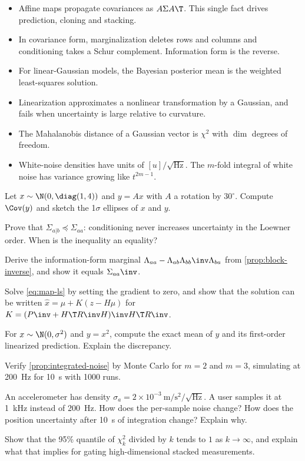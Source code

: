 \begin{takeaways}
\begin{itemize}
  \item Affine maps propagate covariances as $A\Sigma A\T$. This single fact drives prediction,
        cloning and stacking.
  \item In covariance form, marginalization deletes rows and columns and conditioning takes a Schur
        complement. Information form is the reverse.
  \item For linear-Gaussian models, the Bayesian posterior mean is the weighted least-squares
        solution.
  \item Linearization approximates a nonlinear transformation by a Gaussian, and fails when
        uncertainty is large relative to curvature.
  \item The Mahalanobis distance of a Gaussian vector is $\chi^2$ with $\dim$ degrees of freedom.
  \item White-noise densities have units of $[u]/\sqrt{\mathrm{Hz}}$. The $m$-fold integral of white
        noise has variance growing like $t^{2m-1}$.
\end{itemize}
\end{takeaways}

\begin{exercises}
  \item Let $x \sim \N(0, \diag(1, 4))$ and $y = Ax$ with $A$ a rotation by $30^\circ$. Compute
        $\Cov(y)$ and sketch the 1$\sigma$ ellipses of $x$ and $y$.
  \item Prove that $\Sigma_{a|b} \preceq \Sigma_{aa}$: conditioning never increases uncertainty in the
        Loewner order. When is the inequality an equality?
  \item Derive the information-form marginal $\Lambda_{aa} - \Lambda_{ab}\Lambda_{bb}\inv\Lambda_{ba}$
        from \cref{prop:block-inverse}, and show it equals $\Sigma_{aa}\inv$.
  \item Solve \eqref{eq:map-ls} by setting the gradient to zero, and show that the solution can be
        written $\hat x = \mu + K(z - H\mu)$ for $K = (P\inv + H\T R\inv H)\inv H\T R\inv$.
  \item For $x \sim \N(0, \sigma^2)$ and $y = x^2$, compute the exact mean of $y$ and its first-order
        linearized prediction. Explain the discrepancy.
  \item Verify \cref{prop:integrated-noise} by Monte Carlo for $m = 2$ and $m = 3$, simulating at
        200~Hz for 10~s with 1000 runs.
  \item An accelerometer has density $\sigma_a = 2\times10^{-3}~\mathrm{m/s^2/\sqrt{Hz}}$. A user
        samples it at 1~kHz instead of 200~Hz. How does the per-sample noise change? How does the
        position uncertainty after 10~s of integration change? Explain why.
  \item Show that the 95\% quantile of $\chi^2_k$ divided by $k$ tends to $1$ as $k\to\infty$, and
        explain what that implies for gating high-dimensional stacked measurements.
\end{exercises}
